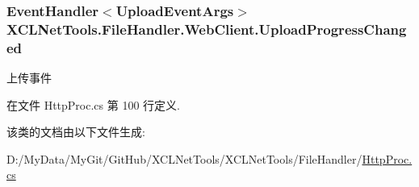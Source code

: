 \hypertarget{class_x_c_l_net_tools_1_1_file_handler_1_1_web_client_abe950fa329508b4c52e3181aeb97585f}{
\subsubsection[{Upload\-Progress\-Changed}]{\setlength{\rightskip}{0pt plus 5cm}Event\-Handler$<${\bf Upload\-Event\-Args}$>$ X\-C\-L\-Net\-Tools.\-File\-Handler.\-Web\-Client.\-Upload\-Progress\-Changed}}\label{class_x_c_l_net_tools_1_1_file_handler_1_1_web_client_abe950fa329508b4c52e3181aeb97585f}


上传事件 



在文件 Http\-Proc.\-cs 第 100 行定义.



该类的文档由以下文件生成\-:\begin{DoxyCompactItemize}
\item 
D\-:/\-My\-Data/\-My\-Git/\-Git\-Hub/\-X\-C\-L\-Net\-Tools/\-X\-C\-L\-Net\-Tools/\-File\-Handler/\hyperlink{_http_proc_8cs}{Http\-Proc.\-cs}\end{DoxyCompactItemize}

